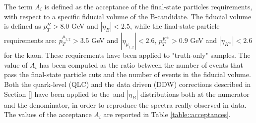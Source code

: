 \noindent
The term $A_i$ is defined as the acceptance of the final-state particles requirements, with respect to a specific fiducial volume of the B-candidate. 
The fiducial volume is defined as $p_T^B > 8.0$ GeV and $|\eta_B| < 2.5$, while the final-state particle requirements are: $p_T^{\mu_{1,2}} > 3.5$ GeV and $|\eta_{\mu_{1,2}}| < 2.6$, $p_T^{K^{\pm}} > 0.9$ GeV and $|\eta_{K^\pm}| < 2.6$ for the kaon. 
These requirements have been applied to "truth-only" samples. 
The value of $A_i$ has been computed as the ratio between the number of events that pass the final-state particle cuts and the number of events in the fiducial volume. 
Both the quark-level (QLC) and the data driven (DDW) corrections described in Section \ref{} have been applied to the \Bpt $\ $and $|\eta_B|$ distributions both at the numerator and the denominator, in order to reproduce the spectra really observed in data. 
The values of the acceptance $A_i$ are reported in Table \ref{table::acceptances}.\\



    
